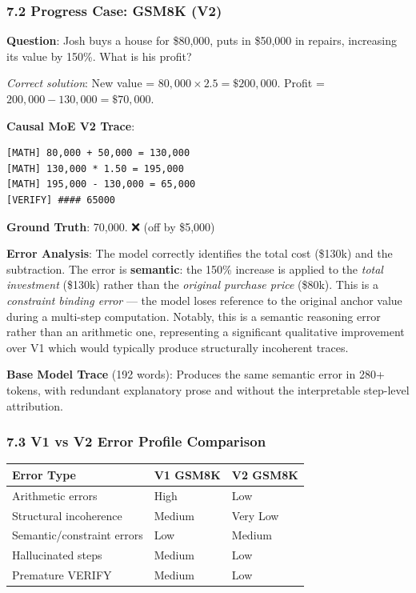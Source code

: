 \subsubsection{7.2 Progress Case: GSM8K
(V2)}\label{progress-case-gsm8k-v2}

\textbf{Question}: Josh buys a house for \$80,000, puts in \$50,000 in
repairs, increasing its value by 150\%. What is his profit?

\emph{Correct solution}: New value = \(80,000 \times 2.5 = \$200,000\).
Profit = \(200,000 - 130,000 = \$70,000\).

\textbf{Causal MoE V2 Trace}:

\begin{verbatim}
[MATH] 80,000 + 50,000 = 130,000
[MATH] 130,000 * 1.50 = 195,000
[MATH] 195,000 - 130,000 = 65,000
[VERIFY] #### 65000
\end{verbatim}

\textbf{Ground Truth}: 70,000. ❌ (off by \$5,000)

\textbf{Error Analysis}: The model correctly identifies the total cost
(\$130k) and the subtraction. The error is \textbf{semantic}: the 150\%
increase is applied to the \emph{total investment} (\$130k) rather than
the \emph{original purchase price} (\$80k). This is a \emph{constraint
binding error} --- the model loses reference to the original anchor
value during a multi-step computation. Notably, this is a semantic
reasoning error rather than an arithmetic one, representing a
significant qualitative improvement over V1 which would typically
produce structurally incoherent traces.

\textbf{Base Model Trace} (192 words): Produces the same semantic error
in 280+ tokens, with redundant explanatory prose and without the
interpretable step-level attribution.

\subsubsection{7.3 V1 vs V2 Error Profile
Comparison}\label{v1-vs-v2-error-profile-comparison}

{\def\LTcaptype{none} %
\begin{longtable}[]{@{}lll@{}}
\toprule\noalign{}
Error Type & V1 GSM8K & V2 GSM8K \\
\midrule\noalign{}
\endhead
\bottomrule\noalign{}
\endlastfoot
Arithmetic errors & High & Low \\
Structural incoherence & Medium & Very Low \\
Semantic/constraint errors & Low & Medium \\
Hallucinated steps & Medium & Low \\
Premature VERIFY & Medium & Low \\
\end{longtable}
}

